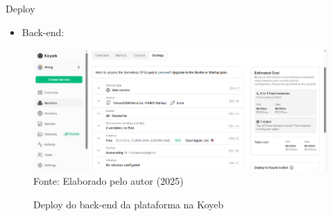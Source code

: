 \begin{frame}{Deploy}
    \begin{itemize}
        \item Back-end:
    \end{itemize}
    \begin{figure}
        \centering
        \vspace{-0.3cm}
        \caption{Deploy do back-end da plataforma na Koyeb}
        \vspace{-0.2cm}
        \includegraphics[width=1\textwidth]{figuras/deploy-2.png}
        \\ %
        \footnotesize Fonte: Elaborado pelo autor (2025)
    \end{figure}
\end{frame}

